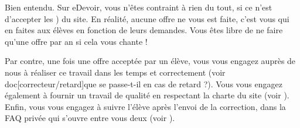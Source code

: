 ﻿Bien entendu. Sur eDevoir, vous n’êtes contraint à rien du tout, si ce n’est d’accepter les ) du site. En réalité, aucune offre ne vous est faite, c’est vous qui en faites aux élèves en fonction de leurs demandes. Vous êtes libre de ne faire qu’une offre par an si cela vous chante !

Par contre, une fois une offre acceptée par un élève, vous vous engagez auprès de nous à réaliser ce travail dans les temps et correctement (voir doc[correcteur/retard]{que se passe-t-il en cas de retard} ?). Vous vous engagez également à fournir un travail de qualité en respectant la charte du site (voir ). Enfin, vous vous engagez à suivre l’élève après l’envoi de la correction, dans la FAQ privée qui s’ouvre entre vous deux (voir ).